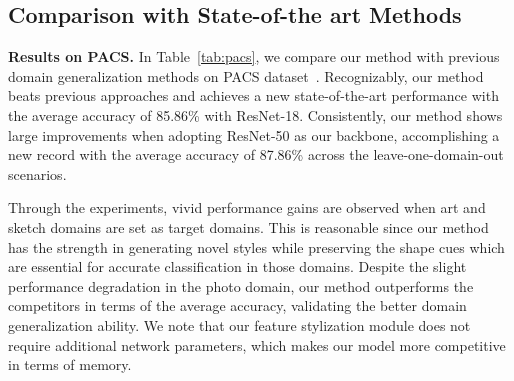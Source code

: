 \documentclass[sigconf]{acmart}
\newcommand{\Tref}[1]{Table~\ref{#1}}
\begin{document}
\subsection{Comparison with State-of-the art Methods}
\noindent\textbf{Results on PACS.} In \Tref{tab:pacs}, we compare our method with previous domain generalization methods on PACS dataset~\cite{Li2017DeeperBA}. Recognizably, our method beats previous approaches and achieves a new state-of-the-art performance with the average accuracy of 85.86\% with ResNet-18.
Consistently, our method shows large improvements when adopting ResNet-50 as our backbone, accomplishing a new record with the average accuracy of 87.86\% across the leave-one-domain-out scenarios. 

Through the experiments, vivid performance gains are observed when art and sketch domains are set as target domains. This is reasonable since our method has the strength in generating novel styles while preserving the shape cues which are essential for accurate classification in those domains.
Despite the slight performance degradation in the photo domain, our method outperforms the competitors in terms of the average accuracy, validating the better domain generalization ability.
We note that our feature stylization module does not require additional network parameters, which makes our model more competitive in terms of memory. 
\end{document}
